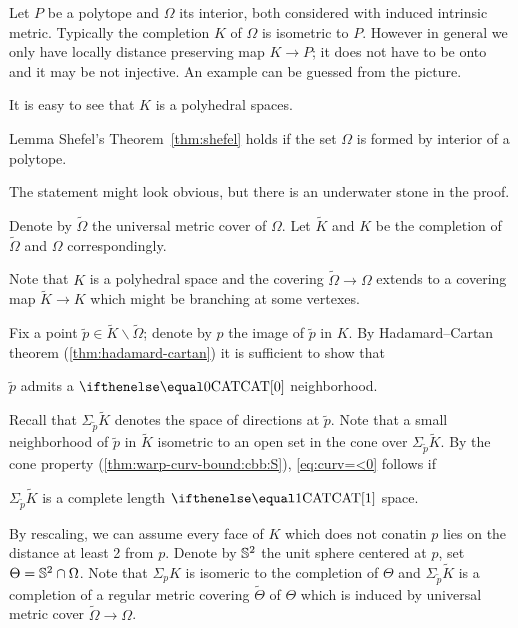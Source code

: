 Let $P$ be a polytope and $\Omega$ its interior,
both considered with induced intrinsic metric.
Typically the completion $K$ of $\Omega$ 
is isometric to $P$.
However in general
we only have locally distance preserving map $K\to P$;
it does not have to be onto and it may be not injective. 
An example can be guessed from the picture.

It is easy to see that $K$ is a polyhedral spaces.


\begin{thm}{Lemma}\label{lem:poly-shefel}
Shefel's Theorem~\ref{thm:shefel} holds if the set $\Omega$ is formed by interior of a polytope.
\end{thm}

The statement might look obvious, but there is an underwater stone in the proof.

Denote by $\tilde\Omega$ the universal metric cover of $\Omega$.
Let $\tilde K$ and $K$ be the completion of $\tilde\Omega$ and  $\Omega$ correspondingly.

Note that $K$ is a polyhedral space and the covering $\tilde\Omega\to\Omega$ extends to a covering map $\tilde K\to K$ which might be branching at some vertexes.

Fix a point $\tilde p\in \tilde K\backslash\tilde\Omega$; 
denote by $p$ the image of $\tilde p$ in $K$.
By Hadamard--Cartan theorem (\ref{thm:hadamard-cartan}) it is sufficient to show that 

\begin{clm}{}\label{eq:curv=<0}
$\tilde p$ admits a $\CAT0$ neighborhood.
\end{clm}


Recall that $\Sigma_{\tilde p}\tilde K$ denotes the space of directions at $\tilde p$.
Note that a small neighborhood of $\tilde p$ in $\tilde K$
isometric to an open set in the cone over $\Sigma_{\tilde p}\tilde K$.
By the cone property (\ref{thm:warp-curv-bound:cbb:S}), \ref{eq:curv=<0} follows if 

\begin{clm}{}\label{eq:curv=<1}
$\Sigma_{\tilde p}\tilde K$ is a complete length $\CAT1$ space.
\end{clm}

By  rescaling, we can assume every face of $K$ which does not conatin $p$ lies on the distance at least 2 from $p$.
Denote by $\mathbb{S}^2$ the unit sphere centered at $p$,
set $\Theta=\SS^2\cap\Omega$.
Note that $\Sigma_pK$ is isomeric to the completion of $\Theta$
and $\Sigma_{\tilde p}\tilde K$ is a completion of a regular metric covering $\tilde\Theta$ of $\Theta$ which is induced by universal metric cover $\tilde \Omega\to \Omega$.

